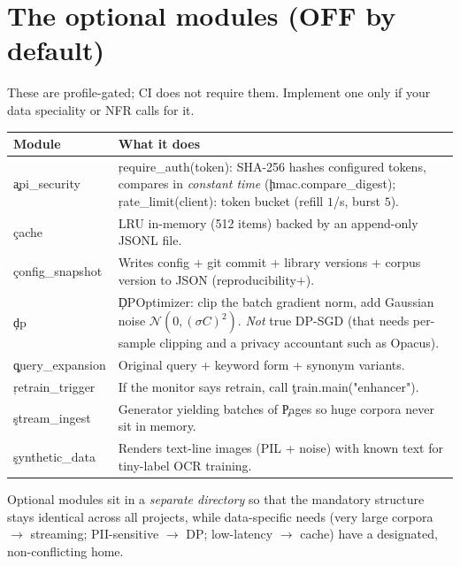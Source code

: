 \section{The optional modules (OFF by default)}
These are profile-gated; CI does not require them. Implement one only if your data speciality or NFR calls for it.
\begin{center}\small\begin{tabular}{@{}p{3.6cm}p{11cm}@{}}\toprule Module & What it does \\ \midrule
\c{api\_security} & \c{require\_auth(token)}: SHA-256 hashes configured tokens, compares in \emph{constant time} (\c{hmac.compare\_digest}); \c{rate\_limit(client)}: token bucket (refill $1$/s, burst $5$). \\
\c{cache} & LRU in-memory (512 items) backed by an append-only JSONL file. \\
\c{config\_snapshot} & Writes config + git commit + library versions + corpus version to JSON (reproducibility$+$). \\
\c{dp} & \c{DPOptimizer}: clip the batch gradient norm, add Gaussian noise $\mathcal N(0,(\sigma C)^2)$. \emph{Not} true DP-SGD (that needs per-sample clipping and a privacy accountant such as Opacus). \\
\c{query\_expansion} & Original query + keyword form + synonym variants. \\
\c{retrain\_trigger} & If the monitor says retrain, call \c{train.main("enhancer")}. \\
\c{stream\_ingest} & Generator yielding batches of \c{Page}s so huge corpora never sit in memory. \\
\c{synthetic\_data} & Renders text-line images (PIL + noise) with known text for tiny-label OCR training. \\
\bottomrule\end{tabular}\end{center}
\begin{why}Optional modules sit in a \emph{separate directory} so that the mandatory structure stays identical across all projects, while data-specific needs (very large corpora $\to$ streaming; PII-sensitive $\to$ DP; low-latency $\to$ cache) have a designated, non-conflicting home.\end{why}

